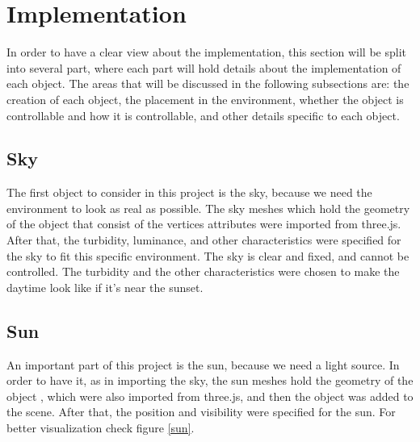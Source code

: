 \documentclass[paper=a4, fontsize=11pt]{scrartcl} %
\numberwithin{equation}{section} %
\numberwithin{figure}{section} %
\numberwithin{table}{section} %
\begin{document}
\newpage


\section{Implementation}

In order to have a clear view about the implementation, this section will be split into several part, where each part will hold details about the implementation of each object. The areas that will be discussed in the following subsections are: the creation of each object, the placement in the environment, whether the object is controllable and how it is controllable, and other details specific to each object.

\subsection{Sky}

The first object to consider in this project is the sky, because we need the environment to look as real as possible. The sky meshes which hold the geometry of the object that consist of the vertices attributes were imported from three.js. After that, the turbidity, luminance, and other characteristics were specified for the sky to fit this specific environment. The sky is clear and fixed, and cannot be controlled. The turbidity and the other characteristics were chosen to make the daytime look like if it's near the sunset.

\subsection{Sun}

An important part of this project is the sun, because we need a light source. In order to have it, as in importing the sky, the sun meshes hold the geometry of the object , which were also imported from three.js, and then the object was added to the scene. After that, the position and visibility were specified for the sun. For better visualization check figure \ref{sun}.
\end{document}
